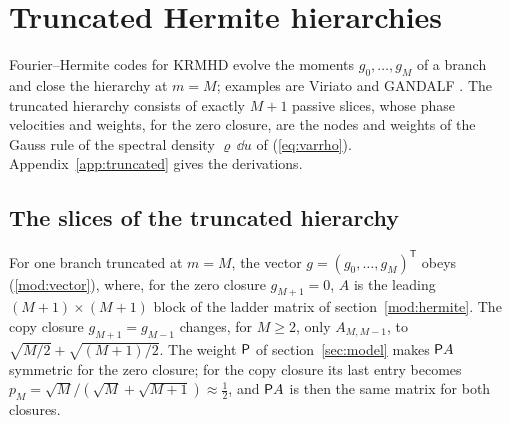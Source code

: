 \section{Truncated Hermite hierarchies}\label{sec:truncated}

Fourier--Hermite codes for KRMHD evolve the moments $g_0,\dots,g_M$ of a branch and close the hierarchy at $m=M$; examples are Viriato \citep{Loureiro2016} and GANDALF \citep{Kanekar2025}. The truncated hierarchy consists of exactly $M+1$ passive slices, whose phase velocities and weights, for the zero closure, are the nodes and weights of the Gauss rule of the spectral density $\varrho\,\dd u$ of (\ref{eq:varrho}). Appendix~\ref{app:truncated} gives the derivations.

\subsection{The slices of the truncated hierarchy}\label{tr:slices}

For one branch truncated at $m=M$, the vector $g=(g_0,\dots,g_M)^{\mathsf T}$ obeys (\ref{mod:vector}), where, for the zero closure $g_{M+1}=0$, $A$ is the leading $(M+1)\times(M+1)$ block of the ladder matrix of section~\ref{mod:hermite}. The copy closure $g_{M+1}=g_{M-1}$ changes, for $M\ge2$, only $A_{M,M-1}$, to $\sqrt{M/2}+\sqrt{(M+1)/2}$. The weight $\mathsf P$ of section~\ref{sec:model} makes $\mathsf P A$ symmetric for the zero closure; for the copy closure its last entry becomes $p_M=\sqrt M/(\sqrt M+\sqrt{M+1})\approx\frac12$, and $\mathsf P A$ is then the same matrix for both closures.

